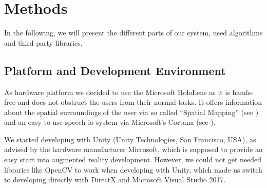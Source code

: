
\section{Methods}
In the following, we will present the different parts of our system, used algorithms and third-party libraries.


\subsection{Platform and Development Environment}
\label{subsec:sucks}
As  hardware platform we decided to use the Microsoft HoloLens as it is hands-free and does not obstruct the users from their normal tasks.
It offers information about the spatial surroundings of the user via so called \enquote{Spatial Mapping} (see ) and an easy to use speech \ac{io} system via Microsoft's Cortana (see ).

We started developing with Unity (Unity Technologies, San Francisco, USA), as advised by the hardware manufacturer Microsoft, which is supposed to provide an  easy start into augmented reality development.
However, we could not get needed libraries like OpenCV to work when developing with Unity, which made us switch to developing directly with DirectX and Microsoft Visual Studio 2017.

